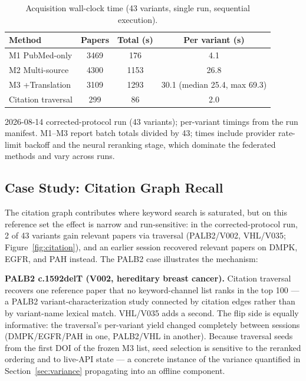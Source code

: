 \documentclass[nonacm,sigconf]{acmart}
\begin{document}
\begin{table}[t]
\centering
\small
\begin{threeparttable}
\caption{Acquisition wall-clock time (43 variants, single run,
sequential execution).}
\label{tab:latency}
\begin{tabular}{@{}lccc@{}}
\toprule
Method & Papers & Total (s) & Per variant (s) \\
\midrule
M1 PubMed-only & 3469 & 176 & 4.1 \\
M2 Multi-source & 4300 & 1153 & 26.8 \\
M3 +Translation & 3109 & 1293 & 30.1 (median 25.4, max 69.3) \\
Citation traversal & 299 & 86 & 2.0 \\
\bottomrule
\end{tabular}
\begin{tablenotes}
\item 2026-08-14 corrected-protocol run (43 variants); per-variant timings
from the run manifest. M1--M3 report batch totals divided by 43; times
include provider rate-limit backoff and the neural reranking stage, which
dominate the federated methods and vary across runs.
\end{tablenotes}
\end{threeparttable}
\end{table}

\subsection{Case Study: Citation Graph Recall}
\label{sec:casestudy}

The citation graph contributes where keyword search is saturated, but on
this reference set the effect is narrow and run-sensitive: in the
corrected-protocol run, 2 of 43 variants gain relevant papers via
traversal (PALB2/V002, VHL/V035; Figure~\ref{fig:citation}), and an
earlier session recovered relevant papers on DMPK, EGFR, and PAH instead.
The PALB2 case illustrates the mechanism:

\textbf{PALB2 c.1592delT (V002, hereditary breast cancer).} Citation
traversal recovers one reference paper that no keyword-channel list ranks
in the top 100 --- a PALB2 variant-characterization study connected by
citation edges rather than by variant-name lexical match. VHL/V035 adds a
second. The flip side is equally informative: the traversal's per-variant
yield changed completely between sessions (DMPK/EGFR/PAH in one, PALB2/VHL
in another). Because traversal seeds from the first DOI of the frozen M3
list, seed selection is sensitive to the reranked ordering and to
live-API state --- a concrete instance of the variance quantified in
Section~\ref{sec:variance} propagating into an offline component.
\end{document}
